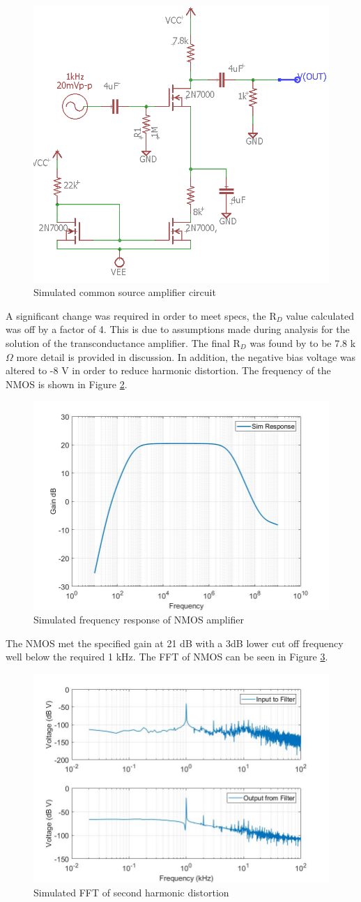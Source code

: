 	\begin{figure}[H]
		\centering
		\includegraphics[width=.55\textwidth]{CircuitDevelopment/NMOS_sim.png}
		\caption{Simulated common source amplifier circuit}
		\label{fig:NMOSsimcircuit}
	\end{figure}

	A significant change was required in order to meet specs, the R$_D$ value calculated was off by a factor of 4. This is due to assumptions made during analysis for the solution of the transconductance amplifier. The final R$_D$ was found by to be 7.8 k$\Omega$ more detail is provided in discussion. In addition, the negative bias voltage was altered to -8 V in order to reduce harmonic distortion. The frequency of the NMOS is shown in Figure \ref{fig:NMOSfreq}.
	
\begin{figure}[H]
		\centering
		\includegraphics[width=.55\textwidth]{CircuitDevelopment/NMOS_bandwidth.jpg}
		\caption{Simulated frequency response of NMOS amplifier}
		\label{fig:NMOSfreq}
\end{figure}

	The NMOS met the specified gain at 21 dB with a 3dB lower cut off frequency well below the required 1 kHz. The FFT of NMOS can be seen in Figure \ref{fig:nmosfft}.

\begin{figure}[H]
	\centering
	\includegraphics[width=.55\textwidth]{CircuitDevelopment/nmos_FFT.jpg}
	\caption{Simulated FFT of second harmonic distortion}
	\label{fig:nmosfft}
\end{figure}

